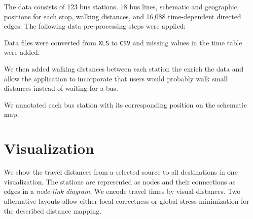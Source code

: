 \documentclass[a4paper, twocolumn,
final
]{article}
\begin{document}
The data consists of 123 bus stations, 18 bus lines, schematic and geographic positions for each stop, walking distances, and 16,088 time-dependent directed edges.
The following data pre-processing steps were applied:
\begin{description}
\setlength{\itemsep}{0pt}
\item[Cleaning.] Data files were converted from \texttt{XLS} to \texttt{CSV} and missing values in the time table 
  were added.
\item[Walking distances.] We then added walking distances between each station the enrich the data and allow the
application to incorporate that users would probably walk small distances instead of waiting for a bus.
\item[Schematic plan positions.]
 We annotated each bus station with its corresponding position on the schematic map.
\end{description}

\section*{Visualization}

We show the travel distances from a selected source to all destinations in one visualization.
The stations are represented as nodes and their connections as edges in a \emph{node-link diagram}.
We encode travel times by visual distances. Two alternative layouts allow either local correctness or global stress minimization for the described distance mapping.

 
\end{document}
